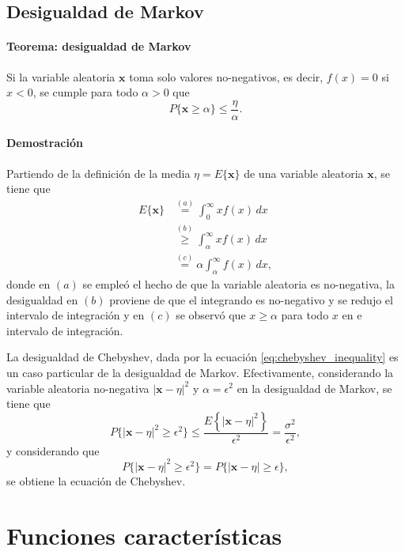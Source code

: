 \documentclass[a4paper]{report}
\newcommand{\x}{\mathbf{x}}
\begin{document}
\subsection{Desigualdad de Markov}

\paragraph{Teorema: desigualdad de Markov} Si la variable aleatoria \(\x\) toma solo valores no-negativos, es decir, \(f(x)=0\) si \(x<0\), se cumple para todo \(\alpha>0\) que
\begin{equation}\label{eq:markov_inequality}
 P\{\x\geq\alpha\}\leq\frac{\eta}{\alpha}.
\end{equation}

\paragraph{Demostración} Partiendo de la definición de la media \(\eta=E\{\x\}\) de una variable aleatoria \(\x\), se tiene que
\begin{align*}
 E\{\x\}&\overset{(a)}{=}\int_{0}^{\infty}xf(x)\,dx\\
  &\overset{(b)}{\geq}\int_{\alpha}^{\infty}xf(x)\,dx\\
  &\overset{(c)}{=}\alpha\int_{\alpha}^{\infty}f(x)\,dx,
\end{align*}
donde en \((a)\) se empleó el hecho de que la variable aleatoria es no-negativa, la desigualdad en \((b)\) proviene de que el integrando es no-negativo y se redujo el intervalo de integración y en \((c)\) se observó que \(x\geq\alpha\) para todo \(x\) en e intervalo de integración.

La desigualdad de Chebyshev, dada por la ecuación \ref{eq:chebyshev_inequality} es un caso particular de la desigualdad de Markov. Efectivamente, considerando la variable aleatoria no-negativa \(|\x-\eta|^2\) y \(\alpha=\epsilon^2\) en la desigualdad de Markov, se tiene que
\[
 P\{|\x-\eta|^2\geq\epsilon^2\}\leq\frac{E\left\{|\x-\eta|^2\right\}}{\epsilon^2}=\frac{\sigma^2}{\epsilon^2},
\]
y considerando que 
\[
 P\{|\x-\eta|^2\geq\epsilon^2\}=P\{|\x-\eta|\geq\epsilon\},
\]
se obtiene la ecuación de Chebyshev.

\section{Funciones características}
\end{document}
